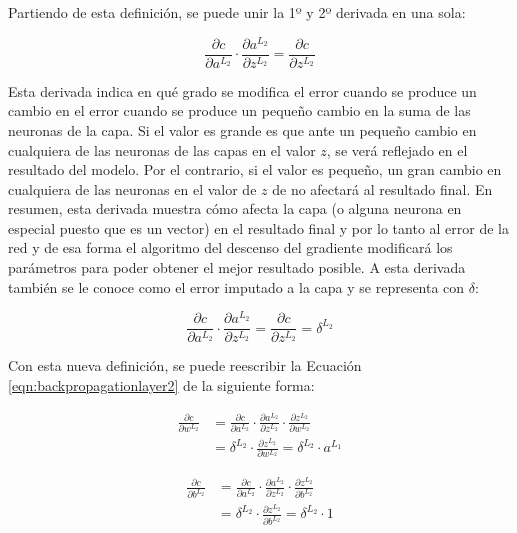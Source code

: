 Partiendo de esta definición, se puede unir la 1º y 2º derivada en una sola:

\begin{equation}
     \frac{\partial c}{\partial a^{L_2}} \cdot \frac{\partial a^{L_2}}{\partial z^{L_2}} = \frac{\partial c}{\partial z^{L_2}}
\end{equation}

Esta derivada indica en qué grado se modifica el error cuando se produce un cambio en el error cuando se produce un pequeño cambio en la suma de las neuronas de la capa. Si el valor es grande es que ante un pequeño cambio en cualquiera de las neuronas de las capas en el valor $z$, se verá reflejado en el resultado del modelo. Por el contrario, si el valor es pequeño, un gran cambio en cualquiera de las neuronas en el valor de $z$ de no afectará al resultado final. En resumen, esta derivada muestra cómo afecta la capa (o alguna neurona en especial puesto que es un vector) en el resultado final y por lo tanto al error de la red y de esa forma el algoritmo del descenso del gradiente modificará los parámetros para poder obtener el mejor resultado posible. A esta derivada también se le conoce como el error imputado a la capa y se representa con $\delta$:  

\begin{equation}
    \frac{\partial c}{\partial a^{L_2}} \cdot \frac{\partial a^{L_2}}{\partial z^{L_2}} = \frac{\partial c}{\partial z^{L_2}} = \delta^{L_2}
\end{equation}

Con esta nueva definición, se puede reescribir la Ecuación \ref{eqn:backpropagationlayer2} de la siguiente forma:

\begin{equation}
\begin{split}
     \frac{\partial c}{\partial w^{L_2}} &= \frac{\partial c}{\partial a^{L_2}} \cdot \frac{\partial a^{L_2}}{\partial z^{L_2}} \cdot \frac{\partial z^{L_2}}{\partial w^{L_2}} \\ &= \delta^{L_2} \cdot \frac{\partial z^{L_2}}{\partial w^{L_2}} = \delta^{L_2} \cdot a^{L_1}
\end{split}
\label{eqn:backpropagation_b}
\end{equation}

\begin{equation}
\begin{split}
     \frac{\partial c}{\partial b^{L_2}} &= \frac{\partial c}{\partial a^{L_2}} \cdot \frac{\partial a^{L_2}}{\partial z^{L_2}} \cdot \frac{\partial z^{L_2}}{\partial b^{L_2}} \\ &= \delta^{L_2} \cdot \frac{\partial z^{L_2}}{\partial b^{L_2}} = \delta^{L_2} \cdot 1
\end{split}
\label{eqn:backpropagation_w}
\end{equation}

